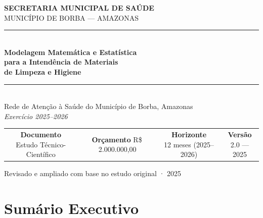\documentclass[12pt,a4paper]{article}
\begin{document}

\begin{titlepage}
  \pagecolor{navyblue}
  \color{white}
  \centering
  \vspace*{2cm}

  {\large\bfseries SECRETARIA MUNICIPAL DE SAÚDE}\\[4pt]
  {\normalsize MUNICÍPIO DE BORBA --- AMAZONAS}\\[3cm]

  \textcolor{lightblue}{\rule{0.8\textwidth}{1.5pt}}\\[0.6cm]
  {\fontsize{26}{32}\selectfont\bfseries
    Modelagem Matemática e Estatística\\[6pt]
    para a Intendência de Materiais\\[6pt]
    de Limpeza e Higiene}\\[0.6cm]
  \textcolor{lightblue}{\rule{0.8\textwidth}{1.5pt}}\\[1.2cm]

  {\large Rede de Atenção à Saúde do Município de Borba, Amazonas}\\[0.3cm]
  {\normalsize\itshape Exercício 2025--2026}\\[3cm]

  \begin{tabular}{cccc}
    \fbox{\parbox{3cm}{\centering\small\textbf{Documento}\\Estudo Técnico-Científico}} &
    \fbox{\parbox{3cm}{\centering\small\textbf{Orçamento}\\R\$\,2.000.000,00}} &
    \fbox{\parbox{3cm}{\centering\small\textbf{Horizonte}\\12 meses (2025--2026)}} &
    \fbox{\parbox{3cm}{\centering\small\textbf{Versão}\\2.0 --- 2025}}
  \end{tabular}

  \vfill
  {\small Revisado e ampliado com base no estudo original · 2025}
\end{titlepage}
\nopagecolor

\tableofcontents
\clearpage

\section{Sumário Executivo}
\end{document}
